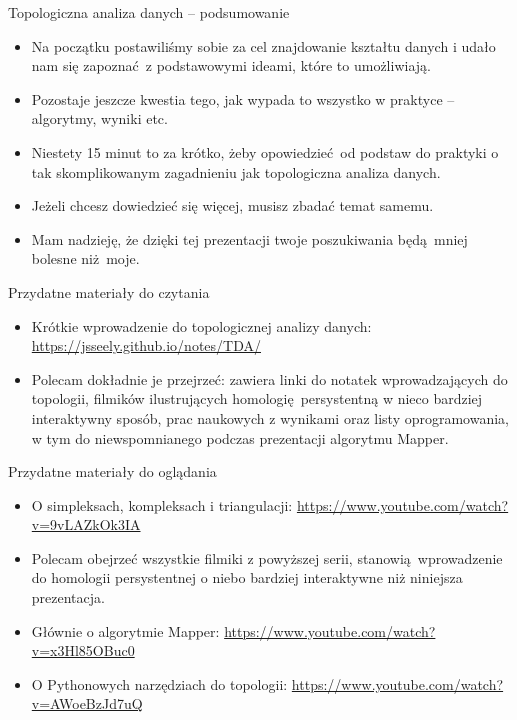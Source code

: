 \documentclass{beamer}
\begin{document}
\begin{frame}{Topologiczna analiza danych -- podsumowanie}
\begin{itemize}
	\item Na początku postawiliśmy sobie za cel znajdowanie kształtu danych i udało nam się zapoznać z podstawowymi ideami, które to umożliwiają.
	\item Pozostaje jeszcze kwestia tego, jak wypada to wszystko w praktyce -- algorytmy, wyniki etc.
	\item Niestety 15 minut to za krótko, żeby opowiedzieć od podstaw do praktyki o tak skomplikowanym zagadnieniu jak topologiczna analiza danych.
	\item Jeżeli chcesz dowiedzieć się więcej, musisz zbadać temat samemu.
	\item Mam nadzieję, że dzięki tej prezentacji twoje poszukiwania będą mniej bolesne niż moje.
\end{itemize}
\end{frame}

\begin{frame}{Przydatne materiały do czytania}
\begin{itemize}
	\item Krótkie wprowadzenie do topologicznej analizy danych: \url{https://jsseely.github.io/notes/TDA/}
	\item Polecam dokładnie je przejrzeć: zawiera linki do notatek wprowadzających do topologii, filmików ilustrujących homologię persystentną w nieco bardziej interaktywny sposób, prac naukowych z wynikami oraz listy oprogramowania, w tym do niewspomnianego podczas prezentacji algorytmu Mapper.
\end{itemize}
\end{frame}

\begin{frame}{Przydatne materiały do oglądania}
\begin{itemize}
	\item O simpleksach, kompleksach i triangulacji: \url{https://www.youtube.com/watch?v=9vLAZkOk3IA}
	\item Polecam obejrzeć wszystkie filmiki z powyższej serii, stanowią wprowadzenie do homologii persystentnej o niebo bardziej interaktywne niż niniejsza prezentacja.
	\item Głównie o algorytmie Mapper: \url{https://www.youtube.com/watch?v=x3Hl85OBuc0}
	\item O Pythonowych narzędziach do topologii: \url{https://www.youtube.com/watch?v=AWoeBzJd7uQ}
\end{itemize}
\end{frame}
	
\end{document}
